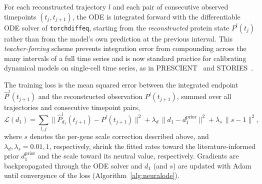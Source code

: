 \documentclass[a4paper, 11pt]{article}
\theoremstyle{plain}
\theoremstyle{remark}
\newcommand*{\firstreview}[1]{{\color{black}#1}}
\begin{document}
\firstreview{For each reconstructed trajectory $l$ and each pair of consecutive observed timepoints $(t_j,t_{j+1})$, the ODE is integrated forward with the differentiable ODE solver of \texttt{torchdiffeq}, starting from the \emph{reconstructed} protein state $P^l(t_j)$ rather than from the model's own prediction at the previous interval. This \emph{teacher-forcing} scheme prevents integration error from compounding across the many intervals of a full time series and is now standard practice for calibrating dynamical models on single-cell time series, as in PRESCIENT~\cite{yeo2021generative} and STORIES~\cite{huizing2025stories}.}

\firstreview{The training loss is the mean squared error between the integrated endpoint $\hat P^l(t_{j+1})$ and the reconstructed observation $P^l(t_{j+1})$, summed over all trajectories and consecutive timepoint pairs,
\begin{equation}
\mathcal{L}(d_1) = \sum_{l,j} \big\| \hat P^l_{d_1}(t_{j+1}) - P^l(t_{j+1}) \big\|^2
+ \lambda_{d}\,\|d_1 - d_1^{\mathrm{prior}}\|^2
+ \lambda_{s}\,\|s - 1\|^2,
\label{eq:neuralode_loss}
\end{equation}
where $s$ denotes the per-gene scale correction described above, and $\lambda_d,\lambda_s = 0.01, 1$, respectively, shrink the fitted rates toward the literature-informed prior $d_1^{\mathrm{prior}}$ and the scale toward its neutral value, respectively. Gradients are backpropagated through the ODE solver and $d_1$ (and $s$) are updated with Adam until convergence of the loss (Algorithm~\ref{alg:neuralode}).}
\end{document}
